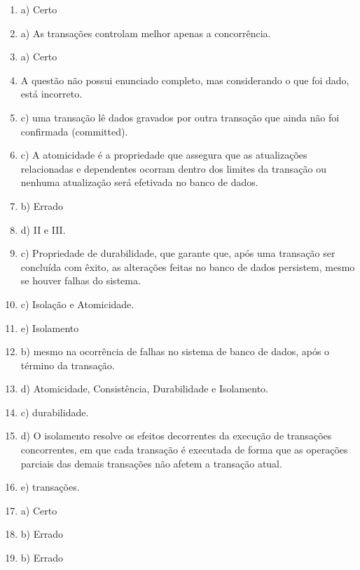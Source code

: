\documentclass{article}
\begin{document}
\begin{enumerate}
    \item a) Certo
    
    \item a) As transações controlam melhor apenas a concorrência.
    
    \item a) Certo
    
    \item A questão não possui enunciado completo, mas considerando o que foi dado, está incorreto.
    
    \item c) uma transação lê dados gravados por outra transação que ainda não foi confirmada (committed).
    
    \item c) A atomicidade é a propriedade que assegura que as atualizações relacionadas e dependentes ocorram dentro dos limites da transação ou nenhuma atualização será efetivada no banco de dados.
    
    \item b) Errado
    
    \item d) II e III.
    
    \item c) Propriedade de durabilidade, que garante que, após uma transação ser concluída com êxito, as alterações feitas no banco de dados persistem, mesmo se houver falhas do sistema.
    
    \item c) Isolação e Atomicidade.
    
    \item e) Isolamento
    
    \item b) mesmo na ocorrência de falhas no sistema de banco de dados, após o término da transação.
    
    \item d) Atomicidade, Consistência, Durabilidade e Isolamento.
    
    \item c) durabilidade.
    
    \item d) O isolamento resolve os efeitos decorrentes da execução de transações concorrentes, em que cada transação é executada de forma que as operações parciais das demais transações não afetem a transação atual.
    
    \item e) transações.
    
    \item a) Certo
    
    \item b) Errado
    
    \item b) Errado

\end{enumerate}
\end{document}
